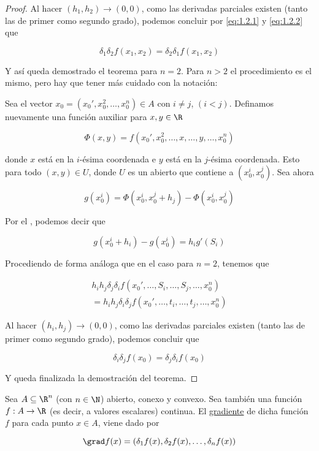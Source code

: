 \begin{proof}
    Al hacer $(h_1, h_2) \to (0, 0)$, como las derivadas parciales existen (tanto las de primer como segundo grado), podemos concluir por \ref{eq:1.2.1} y \ref{eq:1.2.2} que
    
    \[
    \delta_1\delta_2 f(x_1, x_2) = \delta_2\delta_1 f(x_1, x_2)
    \]
    
    Y así queda demostrado el teorema para $n=2$. Para $n>2$ el procedimiento es el mismo, pero hay que tener más cuidado con la notación:
    
    Sea el vector $x_0 = (x_0', x_0^2, \dots, x_0^n) \in A$ con $i \neq j$, $(i < j)$. Definamos nuevamente una función auxiliar para $x, y \in \R$
    
    \[
    \Phi(x,y) = f(x_0', x_0^2, \dots, x, \dots, y, \dots, x_0^n)
    \]
    
    \noindent donde $x$ está en la $i$-ésima coordenada e $y$ está en la $j$-ésima coordenada. Esto para todo $(x, y) \in U$, donde $U$ es un abierto que contiene a $(x_0^i, x_0^j)$. Sea ahora
    
    \[
    g(x_0^i) = \Phi(x_0^i, x_0^j + h_j) - \Phi(x_0^i, x_0^j)
    \]
    
    Por el \TVM, podemos decir que
    
    \[
    g(x_0^i + h_i) - g(x_0^i) = h_ig'(S_i)
    \]
    
    Procediendo de forma análoga que en el caso para $n=2$, tenemos que
    
    \begin{gather*}
        h_ih_j \delta_j\delta_i f(x_0', \dots, S_i, \dots, S_j, \dots, x_0^n) \\
        = h_ih_j \delta_i\delta_j f(x_0', \dots, t_i, \dots, t_j, \dots, x_0^n)
    \end{gather*}
    
    Al hacer $(h_i, h_j) \to (0, 0)$, como las derivadas parciales existen (tanto las de primer como segundo grado), podemos concluir que
    
    \[
    \delta_i\delta_j f(x_0) = \delta_j\delta_i f(x_0)
    \]
    
    Y queda finalizada la demostración del teorema.
\end{proof}

\begin{defn}
    Sea $A \subseteq \R^n$ (con $n \in \N$) abierto, conexo y convexo. Sea también una función $f: A \rightarrow \R$ (es decir, a valores escalares) continua. El \ul{gradiente} de dicha función $f$ para cada punto $x \in A$, viene dado por
    
    \[
    \grad f(x) = \left(\delta_1 f(x), \delta_2 f(x), \dots, \delta_n f(x)\right)
    \]
\end{defn}

